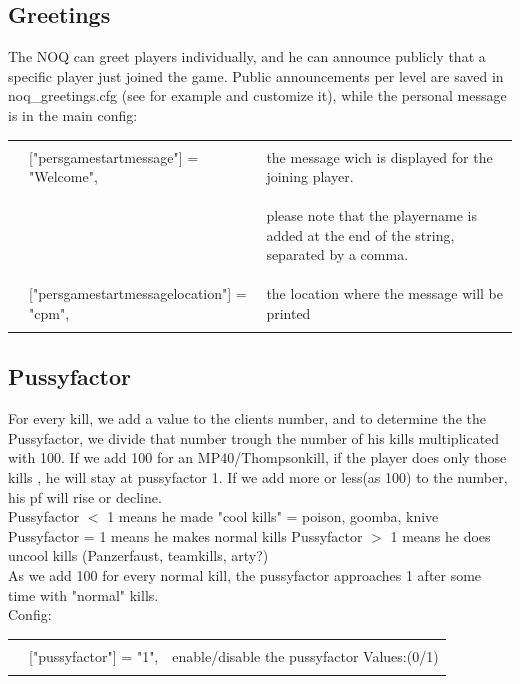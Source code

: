 \documentclass[12pt,a4paper]{article}
\numberwithin{footnote}{page} %
\begin{document}
\subsection{Greetings}

The NOQ can greet players individually, and he can announce publicly that a specific player just joined the game.
Public announcements per level are saved in noq\_greetings.cfg (see for example and customize it), while the personal message is in the main config:
\\
\begin{tabular}{l l|l}
\hline & & \\
 &	["persgamestartmessage"] = "Welcome", & the message wich is displayed for the joining player.	\\
 & & \begin{tiny}
please note that the playername is added at the end of the string, separated by a comma.
\end{tiny} \\
 &	["persgamestartmessagelocation"] = "cpm",			& the location where the message will be printed	\\ 
 & &  \\
 \hline
\end{tabular}

\subsection{Pussyfactor}

For every kill, we add a value to the clients number, and to determine the the Pussyfactor, we divide that number trough the number of his kills multiplicated with 100.
If we add 100 for an MP40/Thompsonkill, if the player does only those kills , he will stay at pussyfactor 1.
If we add more or less(as 100) to the number, his pf will rise or decline.
 \\
Pussyfactor $<$ 1 		means he made "cool kills" = poison, goomba, knive
Pussyfactor = 1 		means he makes normal kills
Pussyfactor $>$ 1      means he does uncool kills (Panzerfaust, teamkills, arty?)
\\
As we add 100 for every normal kill, the pussyfactor approaches 1 after some time with "normal" kills.
\\
Config:\\ 
\begin{tabular}{l l|l}
\hline & & \\
 & ["pussyfactor"] = "1", & enable/disable the pussyfactor Values:(0/1) \\
  & &  \\
 \hline
\end{tabular}
\end{document}
